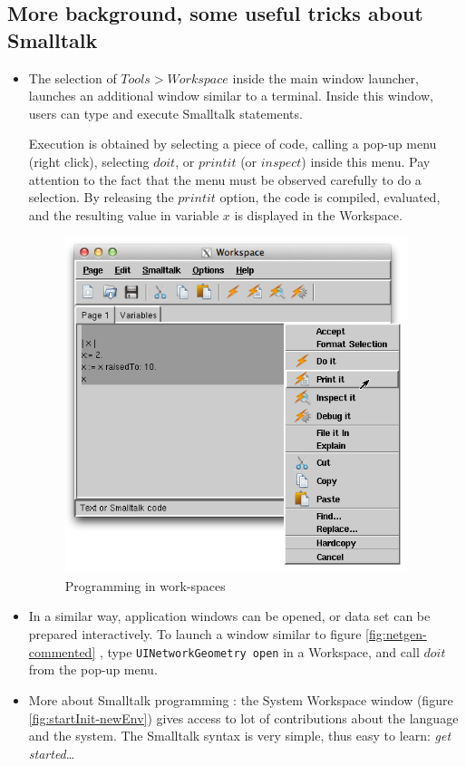 \documentclass[times,a4paper]{book}
\begin{document}
\subsection{More background, some useful tricks about Smalltalk}

\begin{itemize}
\item 
The selection of  $Tools>Workspace$ inside the main window launcher, launches an additional
window similar to a terminal. Inside this window, users can type and execute Smalltalk statements.

Execution is obtained by selecting a piece of code, calling a pop-up menu (right click), selecting 
$do it$, or $ print it$ (or $inspect$) inside this menu. Pay attention to the fact that the menu must be observed
carefully to do a selection. By releasing the $print it$ option, the code is compiled, evaluated, and 
the resulting value in variable $x$ is displayed in the Workspace.


\begin{figure}[hbtp]
\begin{center} 
\includegraphics[width=10cm]{printIt.png}
\caption{Programming in work-spaces}
\label{fig:printIt}
\end{center}
\end{figure}
 
\item 
In a similar way, application windows can be opened, or data set can be prepared
interactively. To launch a window similar to figure \ref{fig:netgen-commented}  , type {\tt UINetworkGeometry open}
in a Workspace,
and call $do it$ from the pop-up menu.

\item 
More about Smalltalk programming : the System Workspace window (figure \ref{fig:startInit-newEnv}) gives access to lot of contributions about the
language and the system. The Smalltalk syntax is very simple, thus easy to learn: {\sl get started}\ldots 


\end{itemize}
\end{document}
